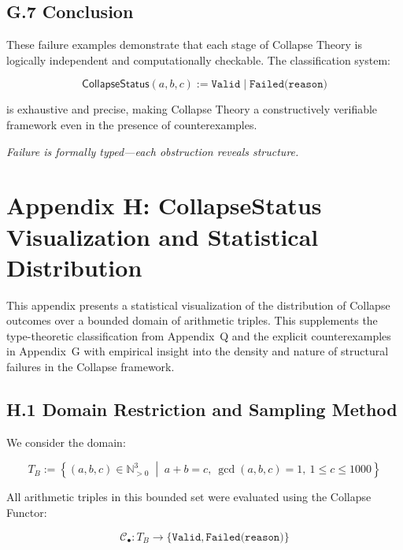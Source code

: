 \documentclass[11pt]{article}
\begin{document}
\subsection*{G.7 Conclusion}

These failure examples demonstrate that each stage of Collapse Theory is logically independent  
and computationally checkable. The classification system:

\[
\mathsf{CollapseStatus}(a,b,c) := \texttt{Valid} \;|\; \texttt{Failed(reason)}
\]

is exhaustive and precise, making Collapse Theory a constructively verifiable framework  
even in the presence of counterexamples.

\begin{center}
\textit{Failure is formally typed—each obstruction reveals structure.}
\end{center}



\section*{Appendix H: CollapseStatus Visualization and Statistical Distribution}

This appendix presents a statistical visualization of the distribution of Collapse outcomes  
over a bounded domain of arithmetic triples. This supplements the type-theoretic classification  
from Appendix~Q and the explicit counterexamples in Appendix~G with empirical insight into  
the density and nature of structural failures in the Collapse framework.

\subsection*{H.1 Domain Restriction and Sampling Method}

We consider the domain:

\[
T_{B} := \left\{ (a,b,c) \in \mathbb{N}_{>0}^3 \;\middle|\; a + b = c,\ \gcd(a,b,c)=1,\ 1 \leq c \leq 1000 \right\}
\]

All arithmetic triples in this bounded set were evaluated using the Collapse Functor:

\[
\mathcal{C}_\bullet : T_B \longrightarrow \{ \texttt{Valid}, \texttt{Failed(reason)} \}
\]
\end{document}
